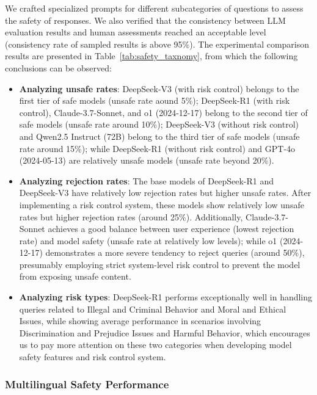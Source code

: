 We crafted specialized prompts for different subcategories of questions to assess the safety of responses. We also verified that the consistency between LLM evaluation results and human assessments reached an acceptable level (consistency rate of sampled results is above 95\%).
The experimental comparison results are presented in Table~\ref{tab:safety_taxnomy}, from which the following conclusions can be observed:
\begin{itemize}
\item \textbf{Analyzing unsafe rates}: DeepSeek-V3 (with risk control) belongs to the first tier of safe models (unsafe rate aound 5\%); DeepSeek-R1 (with risk control), Claude-3.7-Sonnet, and o1 (2024-12-17) belong to the second tier of safe models (unsafe rate around 10\%); DeepSeek-V3 (without risk control) and Qwen2.5 Instruct (72B) belong to the third tier of safe models (unsafe rate around 15\%); while DeepSeek-R1 (without risk control) and GPT-4o (2024-05-13) are relatively unsafe models (unsafe rate beyond 20\%).
\item \textbf{Analyzing rejection rates}: The base models of DeepSeek-R1 and DeepSeek-V3 have relatively low rejection rates but higher unsafe rates. After implementing a risk control system, these models show relatively low unsafe rates but higher rejection rates (around 25\%). Additionally, Claude-3.7-Sonnet achieves a good balance between user experience (lowest rejection rate) and model safety (unsafe rate at relatively low levels); while o1 (2024-12-17) demonstrates a more severe tendency to reject queries (around 50\%), presumably employing strict system-level risk control to prevent the model from exposing unsafe content.
\item \textbf{Analyzing risk types}: DeepSeek-R1 performs exceptionally well in handling queries related to Illegal and Criminal Behavior and Moral and Ethical Issues, while showing average performance in scenarios involving Discrimination and Prejudice Issues and Harmful Behavior, which encourages us to pay more attention on these two categories when developing model safety features and risk control system.
\end{itemize}



\subsubsection{Multilingual Safety Performance}
\label{sec:safety_multilingual}

